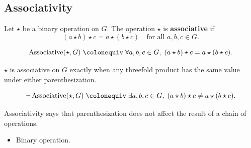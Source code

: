 \subsection{Associativity}
\label{subsec:associativity}

\begin{tcolorbox}[title={Definition --- Associativity}]
\begin{definition}[Associativity]
\label{def:associativity}
Let $\star$ be a binary operation on $G$.
The operation $\star$ is \textbf{associative} if
\[
(a \star b) \star c = a \star (b \star c)
\quad \text{for all } a,b,c \in G.
\]
\end{definition}
\end{tcolorbox}

\begin{remark*}
\[
\operatorname{Associative}(\star,G)
\;\colonequiv\;
\forall a,b,c \in G,\;
(a \star b) \star c = a \star (b \star c).
\]
\end{remark*}

\begin{remark*}
$\star$ is associative on $G$ exactly when any threefold product has the same
value under either parenthesization.
\end{remark*}

\begin{remark*}
\[
\neg\operatorname{Associative}(\star,G)
\;\colonequiv\;
\exists a,b,c\in G,\;
(a\star b)\star c\neq a\star(b\star c).
\]
\end{remark*}

\begin{remark*}[Interpretation]
Associativity says that parenthesization does not affect the result of a
chain of operations.
\end{remark*}

\begin{remark*}[Dependencies]
\begin{itemize}
  \item Binary operation.
\end{itemize}
\end{remark*}
